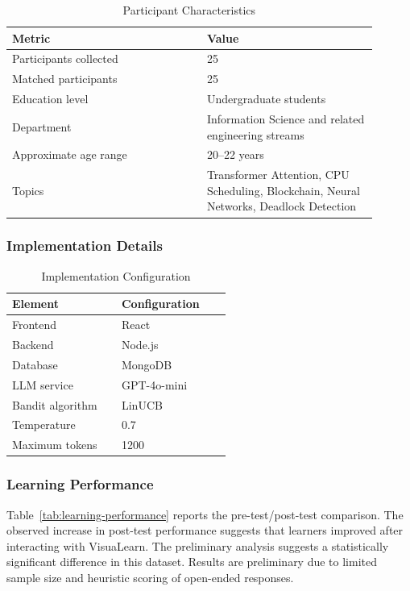 \documentclass[conference]{IEEEtran}
\begin{document}
\begin{table}[htbp]
\caption{Participant Characteristics}
\label{tab:participant-summary}
\centering
\begin{tabular}{p{0.48\linewidth}p{0.42\linewidth}}
\toprule
\textbf{Metric} & \textbf{Value} \\
\midrule
Participants collected & 25 \\
Matched participants & 25 \\
Education level & Undergraduate students \\
Department & Information Science and related engineering streams \\
Approximate age range & 20--22 years \\
Topics & Transformer Attention, CPU Scheduling, Blockchain, Neural Networks, Deadlock Detection \\
\bottomrule
\end{tabular}
\end{table}

\subsubsection{Implementation Details}

\begin{table}[htbp]
\caption{Implementation Configuration}
\label{tab:implementation}
\centering
\begin{tabular}{p{0.44\linewidth}p{0.44\linewidth}}
\toprule
\textbf{Element} & \textbf{Configuration} \\
\midrule
Frontend & React \\
Backend & Node.js \\
Database & MongoDB \\
LLM service & GPT-4o-mini \\
Bandit algorithm & LinUCB \\
Temperature & 0.7 \\
Maximum tokens & 1200 \\
\bottomrule
\end{tabular}
\end{table}

\subsubsection{Learning Performance}

Table~\ref{tab:learning-performance} reports the pre-test/post-test comparison. The observed increase in post-test performance suggests that learners improved after interacting with VisuaLearn. The preliminary analysis suggests a statistically significant difference in this dataset. Results are preliminary due to limited sample size and heuristic scoring of open-ended responses.
\end{document}
